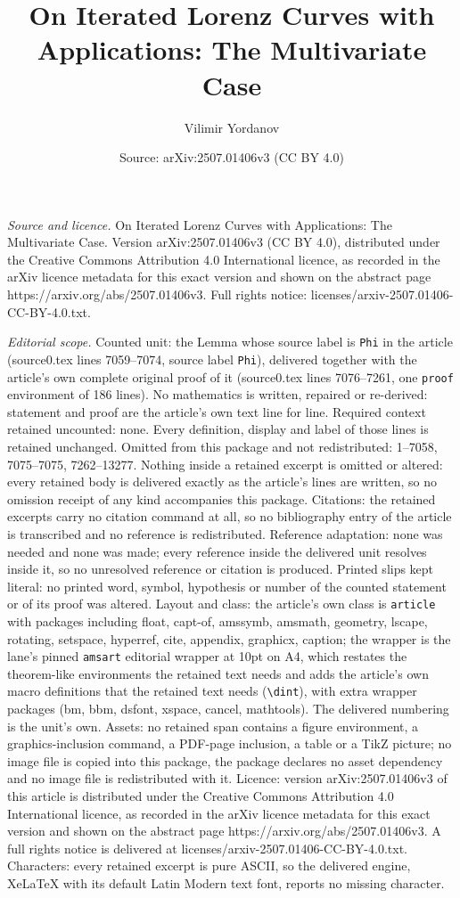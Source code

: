 \documentclass[10pt,a4paper]{amsart}
\title[On Iterated Lorenz Curves with Applications: The Multivariat]{On Iterated Lorenz Curves with Applications: The Multivariate Case}
\author{Vilimir Yordanov}
\date{Source: arXiv:2507.01406v3 (CC BY 4.0)}
\begin{document}
\maketitle

\noindent\emph{Source and licence.} On Iterated Lorenz Curves with Applications: The Multivariate Case. Version arXiv:2507.01406v3 (CC BY 4.0), distributed under the Creative Commons Attribution 4.0 International licence, as recorded in the arXiv licence metadata for this exact version and shown on the abstract page https://arxiv.org/abs/2507.01406v3. Full rights notice: licenses/arxiv-2507.01406-CC-BY-4.0.txt.\par\smallskip

\noindent\textit{Editorial scope.} Counted unit: the Lemma whose source label is \texttt{Phi} in the article (source0.tex lines 7059--7074, source label \texttt{Phi}), delivered together with the article's own complete original proof of it (source0.tex lines 7076--7261, one \texttt{proof} environment of 186 lines). No mathematics is written, repaired or re-derived: statement and proof are the article's own text line for line. Required context retained uncounted: none. Every definition, display and label of those lines is retained unchanged. Omitted from this package and not redistributed: 1--7058, 7075--7075, 7262--13277. Nothing inside a retained excerpt is omitted or altered: every retained body is delivered exactly as the article's lines are written, so no omission receipt of any kind accompanies this package. Citations: the retained excerpts carry no citation command at all, so no bibliography entry of the article is transcribed and no reference is redistributed. Reference adaptation: none was needed and none was made; every reference inside the delivered unit resolves inside it, so no unresolved reference or citation is produced. Printed slips kept literal: no printed word, symbol, hypothesis or number of the counted statement or of its proof was altered. Layout and class: the article's own class is \texttt{article} with packages including float, capt-of, amssymb, amsmath, geometry, lscape, rotating, setspace, hyperref, cite, appendix, graphicx, caption; the wrapper is the lane's pinned \texttt{amsart} editorial wrapper at 10pt on A4, which restates the theorem-like environments the retained text needs and adds the article's own macro definitions that the retained text needs (\texttt{\textbackslash dint}), with extra wrapper packages (bm, bbm, dsfont, xspace, cancel, mathtools). The delivered numbering is the unit's own. Assets: no retained span contains a figure environment, a graphics-inclusion command, a PDF-page inclusion, a table or a TikZ picture; no image file is copied into this package, the package declares no asset dependency and no image file is redistributed with it. Licence: version arXiv:2507.01406v3 of this article is distributed under the Creative Commons Attribution 4.0 International licence, as recorded in the arXiv licence metadata for this exact version and shown on the abstract page https://arxiv.org/abs/2507.01406v3. A full rights notice is delivered at licenses/arxiv-2507.01406-CC-BY-4.0.txt. Characters: every retained excerpt is pure ASCII, so the delivered engine, XeLaTeX with its default Latin Modern text font, reports no missing character.
\end{document}
